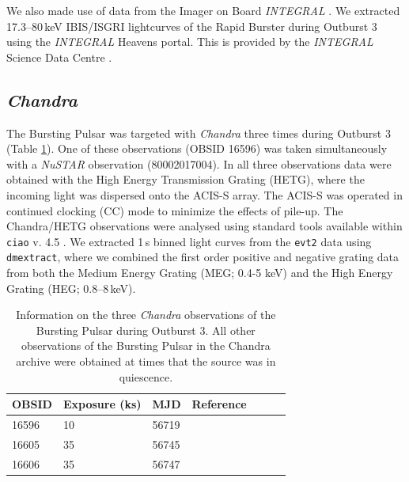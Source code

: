 \par We also made use of data from the Imager on Board \textit{INTEGRAL} \citep{Winkler_IBIS}.  We extracted 17.3--80\,keV IBIS/ISGRI lightcurves of the Rapid Burster during Outburst 3 using the \textit{INTEGRAL} Heavens portal.  This is provided by the \textit{INTEGRAL} Science Data Centre \citep{Lubinski_Heavens}.

\subsection{\textit{Chandra}}

\par The Bursting Pulsar was targeted with \textit{Chandra} \citep{Weisskopf_Chandra} three times during Outburst 3 (Table \ref{tab:Chandra}).  One of these observations (OBSID 16596) was taken simultaneously with a \textit{NuSTAR} observation (80002017004).  In all three observations data were obtained with the High Energy Transmission Grating (HETG), where the incoming light was dispersed onto the ACIS-S \citep{Garmire_ACIS} array. The ACIS-S was operated in continued clocking (CC) mode to minimize the effects of pile-up. The  Chandra/HETG observations were analysed using standard tools available within \texttt{ciao} v. 4.5 \citep{Fruscione_Ciao}. We extracted 1\,s binned light curves from the \texttt{evt2} data using \texttt{dmextract}, where we combined the first order positive and negative grating data from both the Medium Energy Grating (MEG; 0.4-5 keV) and the High Energy Grating (HEG; 0.8--8\,keV).

\begin{table}
\centering
\begin{tabular}{lllllll}
\hline
\hline
\scriptsize  OBSID &\scriptsize Exposure (ks) &\scriptsize MJD &\scriptsize Reference \\
\hline
16596  	& 10 &  56719      &   \citet{Younes_Expo} \\
16605  	& 35 &   56745    &    \citet{Degenaar_BPSpec}\\
16606  	& 35 &   56747    &    \citet{Degenaar_BPSpec}\\
\hline
\hline
\end{tabular}
\caption{Information on the three \textit{Chandra} observations of the Bursting Pulsar during Outburst 3.  All other observations of the Bursting Pulsar in the Chandra archive were obtained at times that the source was in quiescence.}
\label{tab:Chandra}
\end{table}

